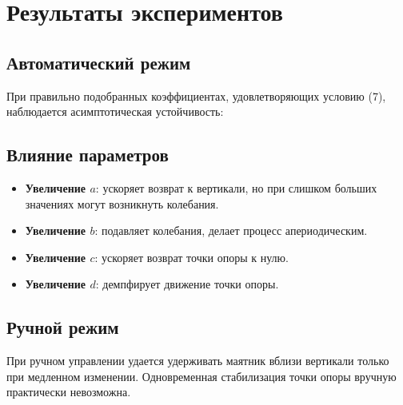 \section{Результаты экспериментов}

\subsection{Автоматический режим}
При правильно подобранных коэффициентах, удовлетворяющих условию (7), наблюдается асимптотическая устойчивость:


\subsection{Влияние параметров}
\begin{itemize}
	\item \textbf{Увеличение \(a\)}: ускоряет возврат к вертикали, но при слишком больших значениях могут возникнуть колебания.
	\item \textbf{Увеличение \(b\)}: подавляет колебания, делает процесс апериодическим.
	\item \textbf{Увеличение \(c\)}: ускоряет возврат точки опоры к нулю.
	\item \textbf{Увеличение \(d\)}: демпфирует движение точки опоры.
\end{itemize}

\subsection{Ручной режим}
При ручном управлении удается удерживать маятник вблизи вертикали только при медленном изменении. Одновременная стабилизация точки опоры вручную практически невозможна.